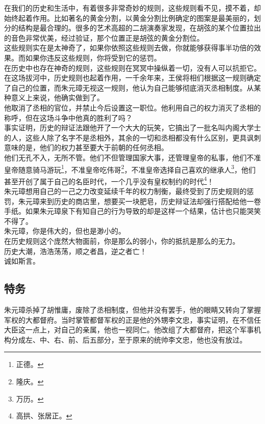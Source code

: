 \begin{multicols}{\theparacolNo}
在我们的历史和生活中，有着很多非常奇妙的规则，这些规则看不见，摸不着，却始终起着作用。比如著名的黄金分割，以黄金分割比例确定的图案是最美丽的，划分的结构是最合理的。很多的艺术高超的二胡演奏家发现，在胡弦的某个位置拉出的音色非常优美，经过验证，那个位置正是胡弦的黄金分割位。\\

这些规则实在是太神奇了，如果你依照这些规则去做，你就能够获得事半功倍的效果。而如果你违反这些规则，你将受到它的惩罚。\\

在历史中也存在神奇的规则，这些规则在冥冥中操纵着一切，没有人可以抗拒它。\\

在这场拔河中，历史规则也起着作用，一千余年来，王侯将相们根据这一规则确定了自己的位置，而朱元璋无视这一规则，他认为自己能够彻底消灭丞相制度。从某种意义上来说，他确实做到了。\\

他取消了丞相的官位，并禁止今后设置这一职位。他利用自己的权力消灭了丞相的称呼，但在这场斗争中他真的胜利了吗？\\

事实证明，历史的辩证法跟他开了一个大大的玩笑，它搞出了一批名叫内阁大学士的人，这些人除了名字不是丞相外，其余的一切和丞相都没有什么区别，更具讽刺意味的是，他们的权力甚至要大于前朝的任何丞相。\\

他们无孔不入，无所不管。他们不但管理国家大事，还管理皇帝的私事，他们不准皇帝随意骑马游玩\footnote{正德。}，不准皇帝吃伟哥\footnote{隆庆。}，不准皇帝选择自己喜欢的继承人\footnote{万历。}，他们甚至开创了属于自己的名臣时代，一个几乎没有皇权制约的时代\footnote{高拱、张居正。}！\\

朱元璋想用自己的一己之力改变延续千年的权力制衡，最终受到了历史规则的惩罚，朱元璋来到历史的商店里，想要买一块肥皂，历史辩证法却强行搭配给他一卷手纸。如果朱元璋泉下有知自己的行为导致的却是这样一个结果，估计也只能哭笑不得了。\\

朱元璋，你是伟大的，但也是渺小的。\\

在历史规则这个庞然大物面前，你是那么的弱小，你的抵抗是那么的无力。\\

历史大潮，浩浩荡荡，顺之者昌，逆之者亡！\\

诚如斯言。\\

\subsection{特务}
朱元璋杀掉了胡惟庸，废除了丞相制度，但他并没有罢手，他的眼睛又转向了掌握军权的大都督府。当时掌管都督军权的正是他的外甥李文忠，事实证明，在不信任大臣这一点上，对自己的亲属，他也一视同仁。他改组了大都督府，把这个军事机构分成左、中、右、前、后五部分，至于原来的统帅李文忠，他也没有放过。\\


\end{multicols}
